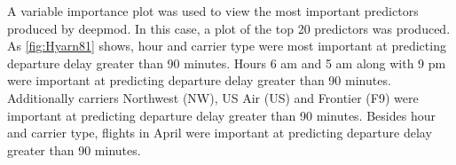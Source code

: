 \documentclass[12pt,twoside]{amherstthesis}
\begin{document}
  \begin{Shaded}
  \begin{Highlighting}[]
  \StringTok{ }\NormalTok{(}\NormalTok{))}
  \StringTok{ }\NormalTok{(}
    \NormalTok{,}
    \NormalTok{,  }
    \NormalTok{,}
     \NormalTok{,}
  \NormalTok{)}
  \end{Highlighting}
  \end{Shaded}
  
  A variable importance plot was used to view the most important
  predictors produced by deepmod. In this case, a plot of the top 20
  predictors was produced. As \autoref{fig:Hyarn81} shows, hour and
  carrier type were most important at predicting departure delay greater
  than 90 minutes. Hours 6 am and 5 am along with 9 pm were important at
  predicting departure delay greater than 90 minutes. Additionally
  carriers Northwest (NW), US Air (US) and Frontier (F9) were important at
  predicting departure delay greater than 90 minutes. Besides hour and
  carrier type, flights in April were important at predicting departure
  delay greater than 90 minutes.
  
  \begin{Shaded}
  \begin{Highlighting}[]
   \NormalTok{)}
  \end{Highlighting}
  \end{Shaded}
  
\end{document}
